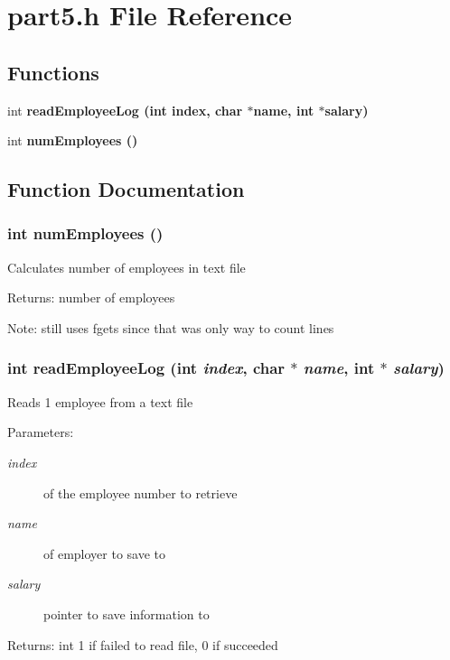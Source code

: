 \section{part5.h File Reference}
\label{part5_8h}
\subsection*{Functions}
\begin{CompactItemize}
\item 
int \bf{read\-Employee\-Log} (int index, char $\ast$name, int $\ast$salary)
\item 
int \bf{num\-Employees} ()
\end{CompactItemize}


\subsection{Function Documentation}
\subsubsection{\setlength{\rightskip}{0pt plus 5cm}int num\-Employees ()}\label{part5_8h_801748b5d2d028f0482ce56bb43d331c}


Calculates number of employees in text file \begin{Desc}
\item[Returns:]number of employees \end{Desc}
\begin{Desc}
\item[Note:]still uses fgets since that was only way to count lines \end{Desc}
\subsubsection{\setlength{\rightskip}{0pt plus 5cm}int read\-Employee\-Log (int {\em index}, char $\ast$ {\em name}, int $\ast$ {\em salary})}\label{part5_8h_6eba06bb925710329353f8f4bcfa3192}


Reads 1 employee from a text file \begin{Desc}
\item[Parameters:]
\begin{description}
\item[{\em index}]of the employee number to retrieve \item[{\em name}]of employer to save to \item[{\em salary}]pointer to save information to \end{description}
\end{Desc}
\begin{Desc}
\item[Returns:]int 1 if failed to read file, 0 if succeeded \end{Desc}
